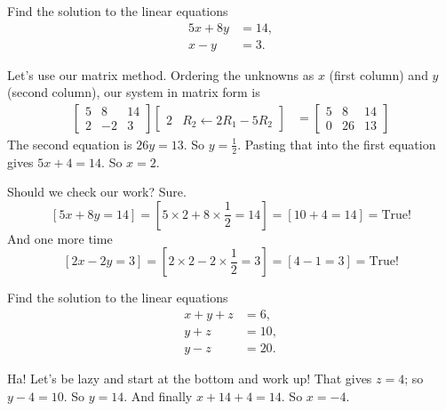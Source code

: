 \documentclass[12pt,fleqn]{exam}
\begin{document}
\begin{questions}


\question [2]  Find the solution to the linear equations
\begin{align*}
   5 x + 8 y &= 14, \\
   x -  y &= 3.
\end{align*}

\begin{solution}[3.0in] Let's use our matrix method. Ordering the unknowns as $x$  (first column) and $y$ (second column), 
   our system in matrix form is
   \begin{align*}
       \begin{bmatrix} 5 & 8 & 14 \\ 2 & -2 & 3 \end{bmatrix}
       \begin{bmatrix}  \\ 2 & R_2 \leftarrow 2 R_1 - 5 R_2 \end{bmatrix}
       &= \begin{bmatrix} 5 & 8 & 14 \\ 0 & 26 & 13 \end{bmatrix}
   \end{align*}
   The second equation is $26 y = 13$. So $y=\frac{1}{2}$. Pasting that into the 
   first equation gives $5 x + 4 = 14$. So $x =2$. 

   Should we check our work?  Sure. 
   \begin{equation*}    
      \left[5 x + 8y = 14\right] = \left[5 \times 2  + 8 \times \frac{1}{2} = 14\right] =
      \left[10 + 4 = 14\right] = \mbox{True!}      
   \end{equation*}
   And one more time
   \begin{equation*}    
      \left[2 x - 2 y = 3\right] = \left[2 \times 2  - 2 \times \frac{1}{2} = 3 \right] =
      \left[4 - 1 = 3\right] = \mbox{True!}      
   \end{equation*}
\end{solution}

\question [2] Find the solution to the linear equations
\begin{align*}
   x + y + z &= 6, \\
   y + z &= 10,\\
   y - z &= 20.
\end{align*}

\begin{solution} Ha! Let's be lazy and start at the bottom and work up! That gives $z=4$;
   so $y- 4 = 10$. So $y=14$. And finally $x + 14 + 4 = 14$. So $x = -4$.


\end{solution}
\end{questions}
\end{document}

